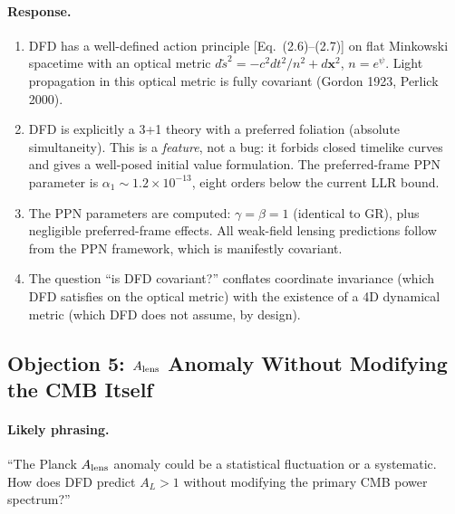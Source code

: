\documentclass[11pt,a4paper]{article}
\begin{document}
\paragraph{Response.}
\begin{enumerate}[label=(\alph*)]
\item DFD has a well-defined action principle [Eq.~(2.6)--(2.7)] on flat
  Minkowski spacetime with an optical metric $d\tilde{s}^2 = -c^2 dt^2/n^2
  + d\mathbf{x}^2$, $n = e^\psi$.  Light propagation in this optical metric
  is fully covariant (Gordon 1923, Perlick 2000).

\item DFD is explicitly a 3+1 theory with a preferred foliation (absolute
  simultaneity).  This is a \emph{feature}, not a bug: it forbids closed
  timelike curves and gives a well-posed initial value formulation.  The
  preferred-frame PPN parameter is $\alpha_1 \sim 1.2 \times 10^{-13}$,
  eight orders below the current LLR bound.

\item The PPN parameters are computed: $\gamma = \beta = 1$ (identical to GR),
  plus negligible preferred-frame effects.  All weak-field lensing predictions
  follow from the PPN framework, which is manifestly covariant.

\item The question ``is DFD covariant?'' conflates coordinate invariance
  (which DFD satisfies on the optical metric) with the existence of a
  4D dynamical metric (which DFD does not assume, by design).
\end{enumerate}

\subsection{Objection 5: $A_{\rm lens}$ Anomaly Without Modifying the CMB Itself}

\paragraph{Likely phrasing.}
``The Planck $A_{\rm lens}$ anomaly could be a statistical fluctuation or
a systematic. How does DFD predict $A_L > 1$ without modifying the primary
CMB power spectrum?''
\end{document}
